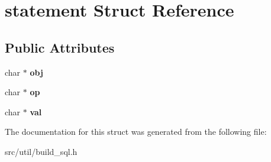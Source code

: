 \hypertarget{structstatement}{}\section{statement Struct Reference}
\label{structstatement}
\subsection*{Public Attributes}
\begin{DoxyCompactItemize}
\item 
\mbox{\label{structstatement_aa59b1ce6cc7019d377f53654a0523370}} 
char $\ast$ {\bfseries obj}
\item 
\mbox{\label{structstatement_a9e68b6f394988603850ad2c279da4261}} 
char $\ast$ {\bfseries op}
\item 
\mbox{\label{structstatement_a04e465c77c360274d45b38db2946cd4c}} 
char $\ast$ {\bfseries val}
\end{DoxyCompactItemize}


The documentation for this struct was generated from the following file\+:\begin{DoxyCompactItemize}
\item 
src/util/build\+\_\+sql.\+h\end{DoxyCompactItemize}
